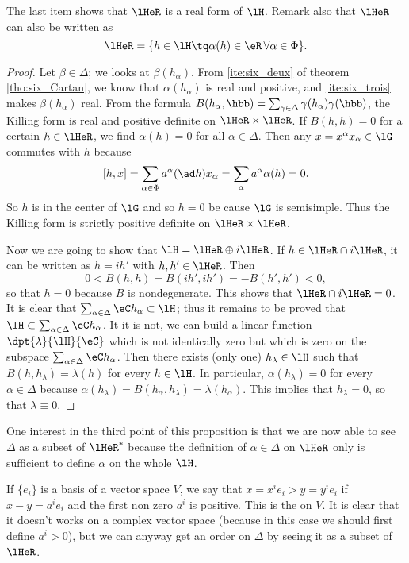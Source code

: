 The last item shows that $\lHeR$ is a real form of $\lH$. Remark also that $\lHeR$ can also be written as
\[
\lHeR=\{h\in\lH\tq \alpha(h)\in\eR\,\forall\alpha\in\Phi \}.
\]
\begin{proof}
Let $\beta\in\Delta$; we looks at $\beta( h_{\alpha})$. From \ref{ite:six_deux} of theorem \ref{tho:six_Cartan}, we know that $\alpha( h_{\alpha})$ is real and positive, and \ref{ite:six_trois} makes $\beta( h_{\alpha})$ real. From the formula $B( h_{\alpha},\hbb)=\sum_{\gamma\in\Delta}\gamma( h_{\alpha})\gamma(\hbb)$, the Killing form is real and positive definite on $\lHeR\times\lHeR$. If $B(h,h)=0$ for a certain $h\in\lHeR$, we find $\alpha(h)=0$ for all $\alpha\in\Delta$. Then any $x=x^{\alpha} x_{\alpha}\in\lG$ commutes with $h$ because
\[
[h,x]=\sum_{\alpha\in\Phi}a^{\alpha}(\ad h) x_{\alpha}=\sum_{\alpha}a^{\alpha}\alpha(h)=0.
\]
So $h$ is in the center of $\lG$ and so $h=0$ be cause $\lG$ is semisimple. Thus the Killing form is strictly positive definite on $\lHeR\times\lHeR$.

Now we are going to show that $\lH=\lHeR\oplus i\lHeR$. If $h\in\lHeR\cap i\lHeR$, it can be written as $h=ih'$ with $h,h'\in\lHeR$. Then
\[
0<B(h,h)=B(ih',ih')=-B(h',h')<0,
\]
so that $h=0$ because $B$ is nondegenerate. This shows that $\lHeR\cap i\lHeR=0$. It is clear that $\sum_{\alpha\in\Delta}\eC h_{\alpha}\subset\lH$; thus it remains to be proved that $\lH\subset\sum_{\alpha\in\Delta}\eC h_{\alpha}$. It it is not, we can build a linear function $\dpt{\lambda}{\lH}{\eC}$ which is not identically zero but which is zero on the subspace $\sum_{\alpha\in\Delta}\eC h_{\alpha}$. Then there exists (only one) $h_{\lambda}\in\lH$ such that $B(h,h_{\lambda})=\lambda(h)$ for every $h\in\lH$. In particular, $\alpha(h_{\lambda})=0$ for every $\alpha\in\Delta$ because $\alpha(h_{\lambda})=B( h_{\alpha},h_{\lambda})=\lambda( h_{\alpha})$. This implies that $h_{\lambda}=0$, so that $\lambda\equiv 0$.

\end{proof}

One interest in the third point of this proposition is that we are now able to see $\Delta$ as a subset of $\lHeR^*$ because the definition of $\alpha\in\Delta$ on $\lHeR$ only is sufficient to define $\alpha$ on the whole $\lH$. 

If $\{e_i\}$ is a basis of a vector space $V$, we say that $x=x^ie_i>y=y^ie_i$ if $x-y=a^ie_i$ and the first non zero $a^i$ is positive. This is the  on $V$. It is clear that it doesn't works on a complex vector space (because in this case we should first define $a^i>0$), but we can anyway get an order on $\Delta$ by seeing it as a subset of $\lHeR$.

